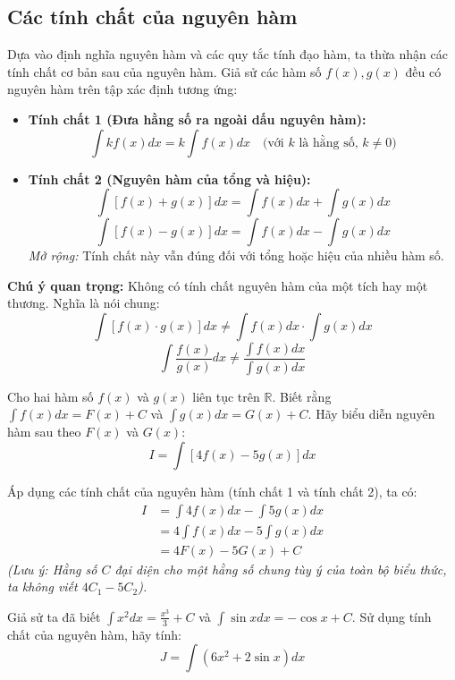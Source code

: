 \documentclass[12pt]{article}
\begin{document}
	\subsection{Các tính chất của nguyên hàm}

	
	Dựa vào định nghĩa nguyên hàm và các quy tắc tính đạo hàm, ta thừa nhận các tính chất cơ bản sau của nguyên hàm. Giả sử các hàm số $f(x), g(x)$ đều có nguyên hàm trên tập xác định tương ứng:
	
	\begin{itemize}
		\item \textbf{Tính chất 1 (Đưa hằng số ra ngoài dấu nguyên hàm):}
		$$\int k f(x)dx = k \int f(x)dx \quad \text{(với } k \text{ là hằng số, } k \neq 0)$$
		
		\item \textbf{Tính chất 2 (Nguyên hàm của tổng và hiệu):} 
		$$\int \left[ f(x) + g(x) \right]dx = \int f(x)dx + \int g(x)dx$$
		$$\int \left[ f(x) - g(x) \right]dx = \int f(x)dx - \int g(x)dx$$
		\textit{Mở rộng:} Tính chất này vẫn đúng đối với tổng hoặc hiệu của nhiều hàm số.
	\end{itemize}
	
	\textbf{Chú ý quan trọng:} Không có tính chất nguyên hàm của một tích hay một thương. Nghĩa là nói chung:
	$$\int \left[ f(x) \cdot g(x) \right]dx \neq \int f(x)dx \cdot \int g(x)dx$$
	$$\int \frac{f(x)}{g(x)}dx \neq \frac{\int f(x)dx}{\int g(x)dx}$$
	
	\begin{vidu}[2]
		Cho hai hàm số $f(x)$ và $g(x)$ liên tục trên $\mathbb{R}$. Biết rằng $\int f(x)dx = F(x) + C$ và $\int g(x)dx = G(x) + C$. Hãy biểu diễn nguyên hàm sau theo $F(x)$ và $G(x)$:
		$$I = \int \left[ 4f(x) - 5g(x) \right]dx$$
	\end{vidu}
	
	\begin{loigiai}
		Áp dụng các tính chất của nguyên hàm (tính chất 1 và tính chất 2), ta có:
		\begin{align*}
			I &= \int 4f(x)dx - \int 5g(x)dx \\
			&= 4\int f(x)dx - 5\int g(x)dx \\
			&= 4F(x) - 5G(x) + C
		\end{align*}
		\textit{(Lưu ý: Hằng số $C$ đại diện cho một hằng số chung tùy ý của toàn bộ biểu thức, ta không viết $4C_1 - 5C_2$).}
	\end{loigiai}
	
	\begin{vidu}[3]
		Giả sử ta đã biết $\int x^2 dx = \frac{x^3}{3} + C$ và $\int \sin x dx = -\cos x + C$. Sử dụng tính chất của nguyên hàm, hãy tính:
		$$J = \int \left( 6x^2 + 2\sin x \right) dx$$
	\end{vidu}
	
\end{document}
